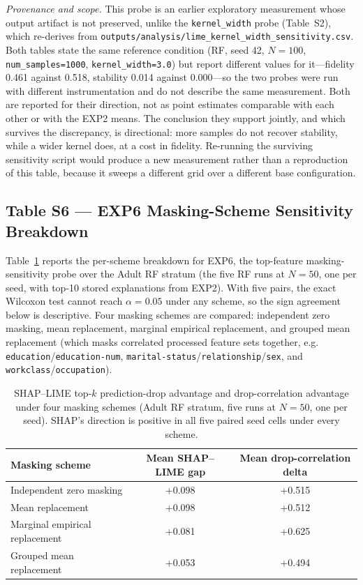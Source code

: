 \documentclass[10pt]{article}
\begin{document}
\noindent\textit{Provenance and scope.} This probe is an earlier exploratory
measurement whose output artifact is not preserved, unlike the
\texttt{kernel\_width} probe (Table~S2), which re-derives from
\texttt{outputs/analysis/lime\_kernel\_width\_sensitivity.csv}. Both tables
state the same reference condition (RF, seed 42, $N=100$,
\texttt{num\_samples=1000}, \texttt{kernel\_width=3.0}) but report different
values for it---fidelity 0.461 against 0.518, stability 0.014 against
0.000---so the two probes were run with different instrumentation and do not
describe the same measurement. Both are reported for their direction, not as
point estimates comparable with each other or with the EXP2 means. The
conclusion they support jointly, and which survives the discrepancy, is
directional: more samples do not recover stability, while a wider kernel
does, at a cost in fidelity. Re-running the surviving sensitivity script
would produce a new measurement rather than a reproduction of this table,
because it sweeps a different grid over a different base configuration.

\subsection*{Table S6 --- EXP6 Masking-Scheme Sensitivity Breakdown}
\label{sec:supp_exp6}

Table~\ref{tab:s6_exp6} reports the per-scheme breakdown for EXP6, the
top-feature masking-sensitivity probe over the Adult RF stratum (the five
RF runs at $N=50$, one per seed, with top-10 stored explanations from
EXP2). With five pairs, the exact Wilcoxon test cannot reach
$\alpha = 0.05$ under any scheme, so the sign agreement below is
descriptive. Four masking
schemes are compared: independent zero masking, mean replacement,
marginal empirical replacement, and grouped mean replacement (which masks
correlated processed feature sets together, e.g.
\texttt{education}/\texttt{education-num},
\texttt{marital-status}/\texttt{relationship}/\texttt{sex}, and
\texttt{workclass}/\texttt{occupation}).

\begin{table}[h]
\centering
\caption{SHAP--LIME top-$k$ prediction-drop advantage and drop-correlation
advantage under four masking schemes (Adult RF stratum, five runs at $N=50$,
one per seed). SHAP's direction is positive in all five paired seed cells under
every scheme.}
\label{tab:s6_exp6}
\begin{tabular}{lcc}
\toprule
Masking scheme & Mean SHAP--LIME gap & Mean drop-correlation delta \\
\midrule
Independent zero masking      & +0.098 & +0.515 \\
Mean replacement               & +0.098 & +0.512 \\
Marginal empirical replacement & +0.081 & +0.625 \\
Grouped mean replacement       & +0.053 & +0.494 \\
\bottomrule
\end{tabular}
\end{table}
\end{document}
